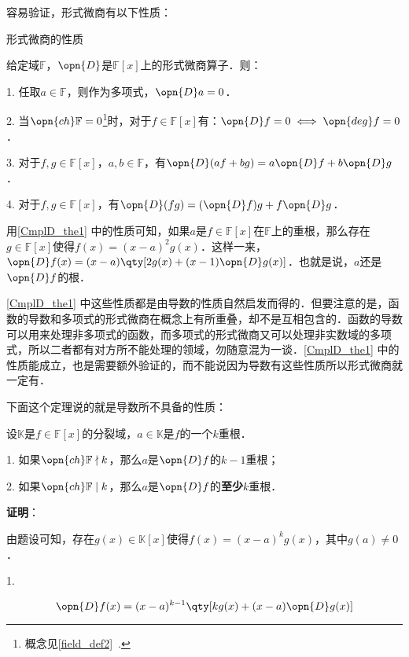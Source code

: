 容易验证，形式微商有以下性质：

\begin{theorem}{形式微商的性质}\label{CmplD_the1}

给定域$\mathbb{F}$，$\opn{D}$是$\mathbb{F}[x]$上的形式微商算子．则：

1. 任取$a\in\mathbb{F}$，则作为多项式，$\opn{D}a=0$．

2. 当$\opn{ch}\mathbb{F}=0$\footnote{概念见\autoref{field_def2}~. }时，对于$f\in\mathbb{F}[x]$有：$\opn{D}f=0 \iff \opn{deg}f=0$．

3. 对于$f, g\in\mathbb{F}[x]$，$a, b\in\mathbb{F}$，有$\opn{D}(af+bg)=a\opn{D}f+b\opn{D}g$．

4. 对于$f, g\in\mathbb{F}[x]$，有$\opn{D}(fg) = (\opn{D}f)g+f\opn{D}g$．

\end{theorem}

用\autoref{CmplD_the1} 中的性质可知，如果$a$是$f\in\mathbb{F}[x]$在$\mathbb{F}$上的重根，那么存在$g\in\mathbb{F}[x]$使得$f(x)=(x-a)^2g(x)$．这样一来，$\opn{D}f(x)=(x-a)\qty[2g(x)+(x-1)\opn{D}g(x)]$．也就是说，$a$还是$\opn{D}f$的根．

\autoref{CmplD_the1} 中这些性质都是由导数的性质自然启发而得的．但要注意的是，函数的导数和多项式的形式微商在概念上有所重叠，却不是互相包含的．函数的导数可以用来处理非多项式的函数，而多项式的形式微商又可以处理非实数域的多项式，所以二者都有对方所不能处理的领域，勿随意混为一谈．\autoref{CmplD_the1} 中的性质能成立，也是需要额外验证的，而不能说因为导数有这些性质所以形式微商就一定有．

下面这个定理说的就是导数所不具备的性质：

\begin{theorem}{}\label{CmplD_the2}
设$\mathbb{K}$是$f\in\mathbb{F}[x]$的分裂域，$a\in\mathbb{K}$是$f$的一个$k$重根．

1. 如果$\opn{ch}\mathbb{F}\nmid k$，那么$a$是$\opn{D}f$的$k-1$重根；

2. 如果$\opn{ch}\mathbb{F}\mid k$，那么$a$是$\opn{D}f$的\textbf{至少}$k$重根．
\end{theorem}

\textbf{证明}：

由题设可知，存在$g(x)\in\mathbb{K}[x]$使得$f(x) = (x-a)^k g(x)$，其中$g(a)\neq 0$．

1. 

\begin{equation}
\opn{D}f(x)=(x-a)^{k-1}\qty[kg(x)+(x-a)\opn{D}g(x)]
\end{equation}

